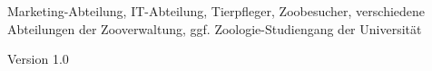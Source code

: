 %
{}{Marketing-Abteilung, IT-Abteilung, Tierpfleger, Zoo\-besucher, verschiedene Abteilungen der Zooverwaltung, ggf. Zoologie-Studiengang der Universität
\begin{flushright}
	\textnormal{\textsf{\footnotesize{Version 1.0}}}
\end{flushright}
}%
{}{}%
{}%